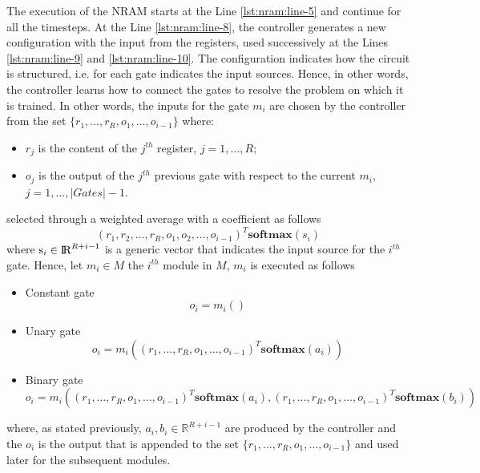 The execution of the NRAM starts at the Line \ref{lst:nram:line-5} and continue for all the timesteps. At the Line \ref{lst:nram:line-8}, the controller generates a new configuration with the input from the registers, used successively at the Lines \ref{lst:nram:line-9} and \ref{lst:nram:line-10}. The configuration indicates how the circuit is structured, i.e. for each gate indicates the input sources. Hence, in other words, the controller learns how to connect the gates to resolve the problem on which it is trained. In other words, the inputs for the gate $m_i$ are chosen by the controller from the set $\{r_{1}, \dots, r_{R}, o_{1}, \dots, o_{i-1}\}$ where:
\begin{itemize}
	\item $r_j$ is the content of the $j^{th}$ register, $j=1,\dots,R$;
	\item $o_j$ is the output of the $j^{th}$ previous gate with respect to the current $m_i$, $j=1,\dots,|Gates| - 1$.
\end{itemize}
selected through a weighted average with a coefficient as follows
\begin{equation}
	(r_1, r_2, \dots, r_R, o_1, o_2, \dots, o_{i-1})^T\textbf{softmax}(s_i)
\end{equation}
where $\textrm{s}_i \in \textrm{I\!R}^{R+i-1}$ is a generic vector that indicates the input source for the $i^{th}$ gate. \newline
Hence, let $m_i \in M$ the $i^{th}$ module in $M$, $m_i$ is executed as follows
\begin{itemize}
	\item{Constant gate
		\begin{equation}
			o_i = m_i()
		\end{equation}
	}
	\item{Unary gate
		\begin{equation}
			o_i = m_i((r_1, \dots, r_R, o_1, \dots, o_{i-1})^T\textbf{softmax}(a_i))
		\end{equation}
	}
	\item{Binary gate
		\begin{equation}
			o_i = m_i((r_1, \dots, r_R, o_1, \dots, o_{i-1})^T\textbf{softmax}(a_i), (r_1, \dots, r_R, o_1, \dots, o_{i-1})^T\textbf{softmax}(b_i))
		\end{equation}
	}
\end{itemize}
where, as stated previously, $a_i, b_i \in \mathbb{R}^{R+i-1}$ are produced by the controller and the $o_i$ is the output that is appended to the set $\{r_{1}, \dots, r_{R}, o_{1}, \dots, o_{i-1}\}$ and used later for the subsequent modules.
